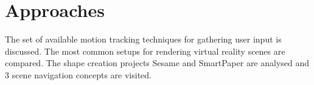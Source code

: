 \section{Approaches}

The set of available motion tracking techniques for gathering user input is discussed.
The most common setups for rendering virtual reality scenes are compared.
The shape creation projects Sesame and SmartPaper are analysed and 3 scene navigation concepts are visited.








